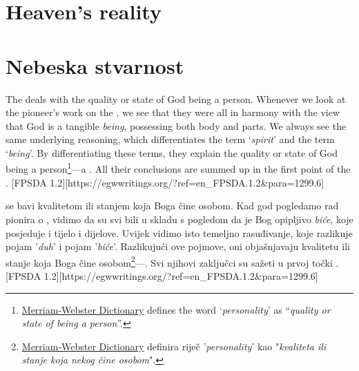 \chapter{Heaven's reality}


\chapter{Nebeska stvarnost}


The  deals with the quality or state of God being a person. Whenever we look at the pioneer's work on the , we see that they were all in harmony with the view that God is a tangible \textit{being}, possessing both body and parts. We always see the same underlying reasoning, which differentiates the term ‘\textit{spirit}’ and the term ‘\textit{being}’. By differentiating these terms, they explain the quality or state of God being a person\footnote{\href{https://www.merriam-webster.com/dictionary/personality}{Merriam-Webster Dictionary} defines the word ‘\textit{personality}’ as “\textit{quality or state of being a person}”.}—a . All their conclusions are summed up in the first point of the . [FPSDA 1.2][https://egwwritings.org/?ref=en\_FPSDA.1.2&para=1299.6]


 se bavi kvalitetom ili stanjem koja Boga čine osobom. Kad god pogledamo rad pionira o , vidimo da su svi bili u skladu s pogledom da je Bog opipljivo \textit{biće}, koje posjeduje i tijelo i dijelove. Uvijek vidimo isto temeljno rasuđivanje, koje razlikuje pojam '\textit{duh}' i pojam '\textit{biće}'. Razlikujući ove pojmove, oni objašnjavaju kvalitetu ili stanje koja Boga čine osobom\footnote{\href{https://www.merriam-webster.com/dictionary/personality}{Merriam-Webster Dictionary} definira riječ '\textit{personality}' kao "\textit{kvaliteta ili stanje koja nekog čine osobom}".}—. Svi njihovi zaključci su sažeti u prvoj točki . [FPSDA 1.2][https://egwwritings.org/?ref=en\_FPSDA.1.2&para=1299.6]


